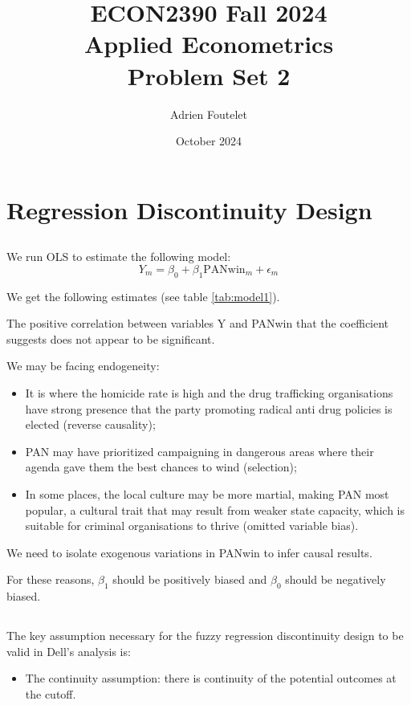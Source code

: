 \documentclass{article}
\title{ECON2390 Fall 2024\\Applied Econometrics\\Problem Set 2}
\author{Adrien Foutelet}
\date{October 2024}
\begin{document}
\maketitle

\section{Regression Discontinuity Design}

\subsection{}

We run OLS to estimate the following model:
\[Y_m = \beta_0 + \beta_1 \text{PANwin}_m + \epsilon_m\]

We get the following estimates (see table \ref{tab:model1}).



The positive correlation between variables Y and PANwin that the coefficient suggests does not appear to be significant.

We may be facing endogeneity:
\begin{itemize}
    \item It is where the homicide rate is high and the drug trafficking organisations have strong presence that the party promoting radical anti drug policies is elected (reverse causality);
    \item PAN may have prioritized campaigning in dangerous areas where their agenda gave them the best chances to wind (selection);
    \item In some places, the local culture may be more martial, making PAN most popular, a cultural trait that may result from weaker state capacity, which is suitable for criminal organisations to thrive (omitted variable bias).
\end{itemize}
We need to isolate exogenous variations in PANwin to infer causal results.

For these reasons, \(\beta_1\) should be positively biased and \(\beta_0\) should be negatively biased.

\subsection{}

The key assumption necessary for the fuzzy regression discontinuity design to be valid in Dell's analysis is:
\begin{itemize}
    \item The continuity assumption: there is continuity of the potential outcomes at the cutoff.
\end{itemize}
\end{document}

